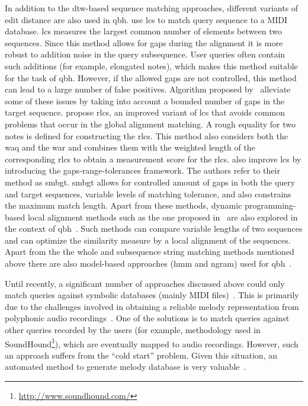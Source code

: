In addition to the \gls{dtw}-based sequence matching approaches, different variants of edit distance are also used in \gls{qbh}. \cite{uitdenbogerd1999melodic} use \gls{lcs} to match query sequence to a MIDI database. \gls{lcs} measures the largest common number of elements between two sequences. Since this method allows for gaps during the alignment it is more robust to addition noise in the query subsequence. User queries often contain such additions (for example, elongated notes), which makes this method suitable for the task of \gls{qbh}. However, if the allowed gaps are not controlled, this method can lead to a large number of false positives. Algorithm proposed by~\cite{iliopoulos2002string} alleviate some of these issues by taking into account a bounded number of gaps in the target sequence. \cite{lin2011music} propose \gls{rlcs}, an improved variant of \gls{lcs} that avoids common problems that occur in the global alignment matching. A rough equality for two notes is defined for constructing the \gls{rlcs}. This method also considers both the \gls{waq} and the \gls{war} and combines them with the weighted length of the corresponding \gls{rlcs} to obtain a measurement score for the \gls{rlcs}. \cite{kotsifakos2011subsequence} also improve \gls{lcs} by introducing the gaps-range-tolerances framework. The authors refer to their method as \gls{smbgt}. \gls{smbgt} allows for controlled amount of gaps in both the query and target sequences, variable levels of matching tolerance, and also constrains the maximum match length. Apart from these methods, dynamic programming-based local alignment methods such as the one proposed in~\cite{smith1981identification} are also explored in the context of \gls{qbh}~\citep{uitdenbogerd1999melodic}. Such methods can compare variable lengths of two sequences and can optimize the similarity measure by a local alignment of the sequences. Apart from the the whole and subsequence string matching methods mentioned above there are also model-based approaches (\acrshort{hmm} and \acrshort{ngram}) used for \gls{qbh}~\citep{durey2001melody,jang2005continuous,uitdenbogerd1999melodic,dannenberg2007comparative}. 

Until recently, a significant number of approaches discussed above could only match queries against symbolic databases (mainly MIDI files)~\citep{kotsifakos2012survey}. This is primarily due to the challenges involved in obtaining a reliable melody representation from polyphonic audio recordings~\citep{salamon2013tonal}. One of the solutions is to match queries against other queries recorded by the users (for example, methodology used in SoundHound\footnote{\url{http://www.soundhound.com/}}), which are eventually mapped to audio recordings. However, such an approach suffers from the ``cold start'' problem. Given this situation, an automated method to generate melody database is very valuable~\citep{salamon2013tonal}. 

